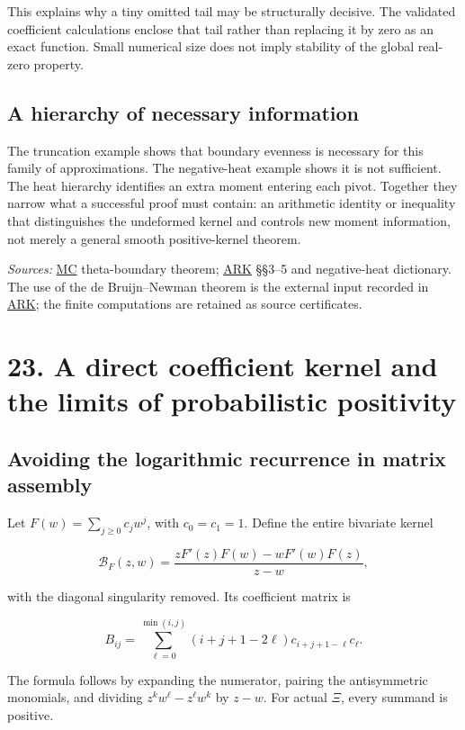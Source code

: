 \documentclass[
  10pt,
  a4paper,
  10pt,
  oneside,
  openany]{book}
\begin{document}
This explains why a tiny omitted tail may be structurally decisive. The
validated coefficient calculations enclose that tail rather than
replacing it by zero as an exact function. Small numerical size does not
imply stability of the global real-zero property.

\subsection{A hierarchy of necessary
information}\label{a-hierarchy-of-necessary-information}

The truncation example shows that boundary evenness is necessary for
this family of approximations. The negative-heat example shows it is not
sufficient. The heat hierarchy identifies an extra moment entering each
pivot. Together they narrow what a successful proof must contain: an
arithmetic identity or inequality that distinguishes the undeformed
kernel and controls new moment information, not merely a general smooth
positive-kernel theorem.

\emph{Sources:} \hyperref[source-mc]{MC} theta-boundary theorem;
\hyperref[source-ark]{ARK} §§3--5 and negative-heat dictionary. The use
of the de Bruijn--Newman theorem is the external input recorded in
\hyperref[source-ark]{ARK}; the finite computations are retained as
source certificates.

\section{23. A direct coefficient kernel and the limits of probabilistic
positivity}\label{ch-bezout}

\subsection{Avoiding the logarithmic recurrence in matrix
assembly}\label{avoiding-the-logarithmic-recurrence-in-matrix-assembly}

Let \(F(w)=\sum_{j\ge0}c_jw^j\), with \(c_0=c_1=1\). Define the entire
bivariate kernel

\[
\mathcal B_F(z,w)=
\frac{zF'(z)F(w)-wF'(w)F(z)}{z-w},
\tag{23.1}\label{eq:23.1}
\]

with the diagonal singularity removed. Its coefficient matrix is

\[
B_{ij}=\sum_{\ell=0}^{\min(i,j)}
(i+j+1-2\ell)c_{i+j+1-\ell}c_\ell.
\tag{23.2}\label{eq:23.2}
\]

The formula follows by expanding the numerator, pairing the
antisymmetric monomials, and dividing \(z^kw^\ell-z^\ell w^k\) by
\(z-w\). For actual \(\Xi\), every summand is positive.
\end{document}
